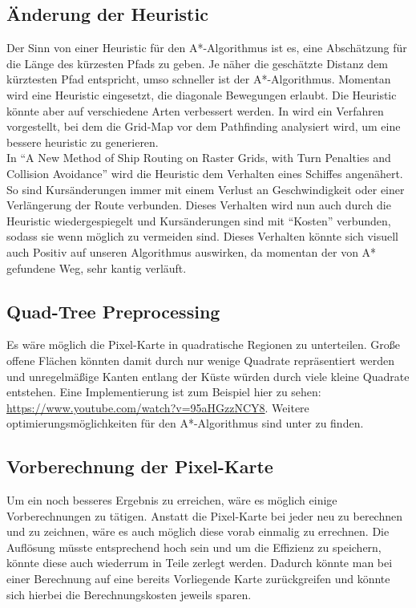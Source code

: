 \documentclass[letterpaper]{article}
\begin{document}

	\subsection{Änderung der Heuristic}
		Der Sinn von einer Heuristic für den A*-Algorithmus ist es, eine Abschätzung für die Länge des kürzesten Pfads zu geben. Je näher die geschätzte Distanz dem kürztesten Pfad entspricht, umso schneller ist der A*-Algorithmus. Momentan wird eine Heuristic eingesetzt, die diagonale Bewegungen erlaubt. Die Heuristic könnte aber auf verschiedene Arten verbessert werden. In \cite{andrew04} wird ein Verfahren vorgestellt, bei dem die Grid-Map vor dem Pathfinding analysiert wird, um eine bessere heuristic zu generieren.\\

		In "`A New Method of Ship Routing on Raster Grids, with Turn Penalties and Collision Avoidance"'\cite{szlapczynski06} wird die Heuristic dem Verhalten eines Schiffes angenähert. So sind Kursänderungen immer mit einem Verlust an Geschwindigkeit oder einer Verlängerung der Route verbunden. Dieses Verhalten wird nun auch durch die Heuristic wiedergespiegelt und Kursänderungen sind mit "`Kosten"' verbunden, sodass sie wenn möglich zu vermeiden sind. Dieses Verhalten könnte sich visuell auch Positiv auf unseren Algorithmus auswirken, da momentan der von A* gefundene Weg, sehr kantig verläuft.

	\subsection{Quad-Tree Preprocessing}
		Es wäre möglich die Pixel-Karte in quadratische Regionen zu unterteilen. Große offene Flächen könnten damit durch nur wenige Quadrate repräsentiert werden und unregelmäßige Kanten entlang der Küste würden durch viele kleine Quadrate entstehen. Eine Implementierung ist zum Beispiel hier zu sehen: \url{https://www.youtube.com/watch?v=95aHGzzNCY8}. Weitere optimierungsmöglichkeiten für den A*-Algorithmus sind unter \cite{patel16} zu finden.

	\subsection{Vorberechnung der Pixel-Karte}
		Um ein noch besseres Ergebnis zu erreichen, wäre es möglich einige Vorberechnungen zu tätigen. Anstatt die Pixel-Karte bei jeder neu zu berechnen und zu zeichnen, wäre es auch möglich diese vorab einmalig zu errechnen. Die Auflösung müsste entsprechend hoch sein und um die Effizienz zu speichern, könnte diese auch wiederrum in Teile zerlegt werden. Dadurch könnte man bei einer Berechnung auf eine bereits Vorliegende Karte zurückgreifen und könnte sich hierbei die Berechnungskosten jeweils sparen.
\end{document}
